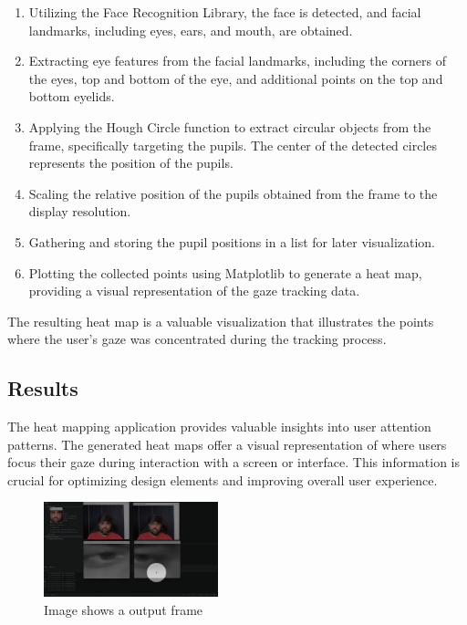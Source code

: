 \documentclass[letterpaper, 10 pt, conference]{ieeeconf}  %
\begin{document}
\begin{enumerate}
    \item Utilizing the Face Recognition Library, the face is detected, and facial landmarks, including eyes, ears, and mouth, are obtained.
    \item Extracting eye features from the facial landmarks, including the corners of the eyes, top and bottom of the eye, and additional points on the top and bottom eyelids.
    \item Applying the Hough Circle function to extract circular objects from the frame, specifically targeting the pupils. The center of the detected circles represents the position of the pupils.
    \item Scaling the relative position of the pupils obtained from the frame to the display resolution.
    \item Gathering and storing the pupil positions in a list for later visualization.
    \item Plotting the collected points using Matplotlib to generate a heat map, providing a visual representation of the gaze tracking data.
\end{enumerate}

The resulting heat map is a valuable visualization that illustrates the points where the user's gaze was concentrated during the tracking process.

\subsection{Results}

The heat mapping application provides valuable insights into user attention patterns. The generated heat maps offer a visual representation of where users focus their gaze during interaction with a screen or interface. This information is crucial for optimizing design elements and improving overall user experience.

\begin{figure}
  \centering
  \includegraphics[width=0.45\textwidth]{heat1.png} %
  \caption{Image shows a output frame }
  \label{fig:your_label}
\end{figure}
\end{document}
